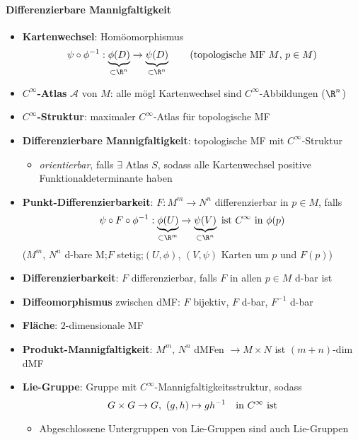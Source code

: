 \paragraph{Differenzierbare Mannigfaltigkeit}
\begin{itemize}
  \item \textbf{Kartenwechsel}: Homöomorphismus
  \begin{equation*}
    \psi \circ \phi^{-1} : \underbrace{\phi(D)}_{\subset \R^n} \to \underbrace{\psi(D)}_{\subset \R^n} \qquad \text{(topologische MF \( M \), \( p \in M \))}
  \end{equation*}
  \item \textbf{\( C^\infty \)-Atlas} \( \mathcal{A} \) von \( M \): alle mögl Kartenwechsel sind \( C^\infty \)-Abbildungen (\( \R^n \))
  \item \textbf{\( C^\infty \)-Struktur}: maximaler \( C^\infty \)-Atlas für topologische MF
  \item \textbf{Differenzierbare Mannigfaltigkeit}: topologische MF mit \( C^\infty \)-Struktur
  \begin{itemize}
    \item \emph{orientierbar}, falls \( \exists \) Atlas \( S \), sodass alle Kartenwechsel positive Funktionaldeterminante haben
  \end{itemize}
  \item \textbf{Punkt-Differenzierbarkeit}: \( F : M^m \to N^n \) differenzierbar in \( p \in M \), falls
  \begin{equation*}
    \psi \circ F \circ \phi^{-1} : \underbrace{\phi(U)}_{\subset \R^m} \to \underbrace{\psi(V)}_{\subset \R^n} \text{ ist \( C^\infty \) in \( \phi(p) \)}
  \end{equation*}
  (\( M^m \), \( N^n \) d-bare M;\@ \( F \) stetig;\@ \( (U,\phi) \), \( (V,\psi) \) Karten um \( p \) und \( F(p) \))
  \item \textbf{Differenzierbarkeit}: \( F \) differenzierbar, falls \( F \) in allen \( p \in M \) d-bar ist
  \item \textbf{Diffeomorphismus} zwischen dMF: \( F \) bijektiv, \( F \) d-bar, \( F^{-1} \) d-bar 
  \item \textbf{Fläche}: \( 2 \)-dimensionale MF
  \item \textbf{Produkt-Mannigfaltigkeit}: \( M^m \), \( N^n \) dMFen \( \to M \times N \) ist \( (m+n) \)-dim dMF
  \item \textbf{Lie-Gruppe}: Gruppe mit \( C^\infty \)-Mannigfaltigkeitsstruktur, sodass
  \begin{equation*}
    G \times G \to G\text{,} \enskip (g,h) \mapsto gh^{-1} \quad \text{in \( C^\infty \) ist}
  \end{equation*}
  \begin{itemize}
    \item Abgeschlossene Untergruppen von Lie-Gruppen sind auch Lie-Gruppen
  \end{itemize}
\end{itemize}

